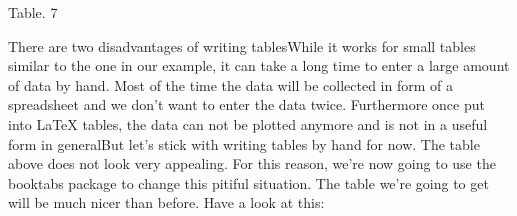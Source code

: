 \documentclass[onecolumn,journal] {IEEEtran}
\begin{document}
\begin{center}
Table. 7
\end{center}
\begin{flushleft}

There are two disadvantages of writing tablesWhile it works for small tables similar to the one in our example, it can take a long time to enter a large amount of data by hand. Most of the time the data will be collected in form of a spreadsheet and we don't want to enter the data twice. Furthermore once put into LaTeX tables, the data can not be plotted anymore and is not in a useful form in generalBut let's stick with writing tables by hand for now. The table above does not look very appealing. For this reason, we're now going to use the booktabs package to change this pitiful situation. The table we're going to get will be much nicer than before. Have a look at this:
 \end{flushleft}
\end{document}
